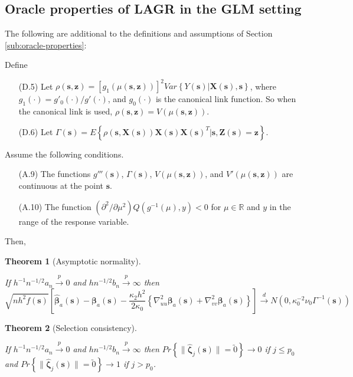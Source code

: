 \documentclass[authoryear,review, 12pt]{elsarticle}
\newtheorem{thm}{Theorem}
\begin{document}
\subsection{Oracle properties of LAGR in the GLM setting}

The following are additional to the definitions and assumptions of
Section \ref{sub:oracle-properties}:

Define
\begin{itemize}
\item[(D.5)] Let $\rho\left(\bm{s},\bm{z}\right)=\left[g_{1}\left(\mu\left(\bm{s},\bm{z}\right)\right)\right]^{2}Var\left\{ Y\left(\bm{s}\right)|\bm{X}\left(\bm{s}\right),\bm{s}\right\} $,
where $g_{1}\left(\cdot\right)=g'_{0}\left(\cdot\right)/g'\left(\cdot\right)$,
and $g_{0}\left(\cdot\right)$ is the canonical link function. So
when the canonical link is used, $\rho\left(\bm{s},\bm{z}\right)=V\left(\mu\left(\bm{s},\bm{z}\right)\right)$.
\item[(D.6)] Let $\Gamma\left(\bm{s}\right)=E\left\{ \rho\left(\bm{s},\bm{X}\left(\bm{s}\right)\right)\bm{X}\left(\bm{s}\right)\bm{X}\left(\bm{s}\right)^{T}|\bm{s},\bm{Z}\left(\bm{s}\right)=\bm{z}\right\} $.
\end{itemize}
Assume the following conditions.
\begin{itemize}
\item[(A.9)] The functions $g'''\left(\bm{s}\right)$, $\Gamma\left(\bm{s}\right)$,
$V\left(\mu\left(\bm{s},\bm{z}\right)\right)$, and $V'\left(\mu\left(\bm{s},\bm{z}\right)\right)$
are continuous at the point $\bm{s}$.
\item[(A.10)] The function $\left(\partial^{2}/\partial\mu^{2}\right)Q\left(g^{-1}\left(\mu\right),y\right)<0$
for $\mu\in\mathbb{R}$ and $y$ in the range of the response variable.
\end{itemize}
Then,
\begin{thm}[Asymptotic normality]
\label{theorem:normality-glm} 



If $h^{-1}n^{-1/2}a_{n}\xrightarrow{p}0$ and $hn^{-1/2}b_{n}\xrightarrow{p}\infty$
then 
\[
\sqrt{nh^{2}f\left(\bm{s}\right)}\left[\hat{\bm{\beta}}_{a}(\bm{s})-\bm{\beta}_{a}(\bm{s})-\frac{\kappa_{2}h^{2}}{2\kappa_{0}}\left\{ \nabla_{uu}^{2}\bm{\beta}_{a}(\bm{s})+\nabla_{vv}^{2}\bm{\beta}_{a}(\bm{s})\right\} \right]\xrightarrow{d}N\left(0,\kappa_{0}^{-2}\nu_{0}\Gamma^{-1}(\bm{s})\right)
\]

\end{thm}

\begin{thm}[Selection consistency]
\label{theorem:selection-glm}



If $h^{-1}n^{-1/2}a_{n}\xrightarrow{p}0$ and $hn^{-1/2}b_{n}\xrightarrow{p}\infty$
then $Pr\left\{ \|\hat{\bm{\zeta}}_{j}(\bm{s})\|=\utilde{0}\right\} \to0$
if $j\le p_{0}$ and $Pr\left\{ \|\hat{\bm{\zeta}}_{j}(\bm{s})\|=\utilde{0}\right\} \to1$
if $j>p_{0}$. 
\end{thm}
\appendix
\end{document}
